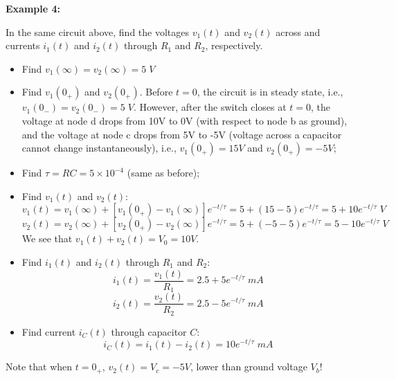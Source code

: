 {\bf Example 4:}

In the same circuit above, find the voltages $v_1(t)$ and $v_2(t)$ 
across and currents $i_1(t)$ and $i_2(t)$ through $R_1$ and $R_2$, 
respectively.


\begin{itemize}
\item Find $v_1(\infty)=v_2(\infty)=5\;V$
\item Find $v_1(0_+)$ and $v_2(0_+)$. Before $t=0$, the circuit is in
	steady state, i.e., $v_1(0_-)=v_2(0_-)=5\;V$. However, after
	the switch closes at $t=0$, the voltage at node d drops from 
	10V to 0V (with respect to node b as ground), and the voltage 
        at node c drops from 5V to -5V (voltage across a capacitor 
        cannot change instantaneously), i.e., $v_1(0_+)=15V$ and 
        $v_2(0_+)=-5V$; 
\item Find $\tau=RC=5\times 10^{-4}$ (same as before);
\item Find $v_1(t)$ and $v_2(t)$:
  \[	v_1(t)=v_1(\infty)+[v_1(0_+)-v_1(\infty)]e^{-t/\tau}
	=5+(15-5)e^{-t/\tau}=5+10e^{-t/\tau}\;V	\]
  \[	v_2(t)=v_2(\infty)+[v_2(0_+)-v_2(\infty)]e^{-t/\tau}
	=5+(-5-5)e^{-t/\tau}=5-10e^{-t/\tau}\;V	\]
	We see that $v_1(t)+v_2(t)=V_0=10V$.
\item Find $i_1(t)$ and $i_2(t)$ through $R_1$ and $R_2$:
  \[	i_1(t)=\frac{v_1(t)}{R_1}=2.5+5e^{-t/\tau}\;mA	\]
  \[	i_2(t)=\frac{v_2(t)}{R_2}=2.5-5e^{-t/\tau}\;mA	\]
\item Find current $i_C(t)$ through capacitor $C$:
  \[    i_C(t)=i_1(t)-i_2(t)=10 e^{-t/\tau}\; mA  \]
\end{itemize}
Note that when $t=0_+$, $v_2(t)=V_c=-5V$, lower than ground voltage $V_b$!


